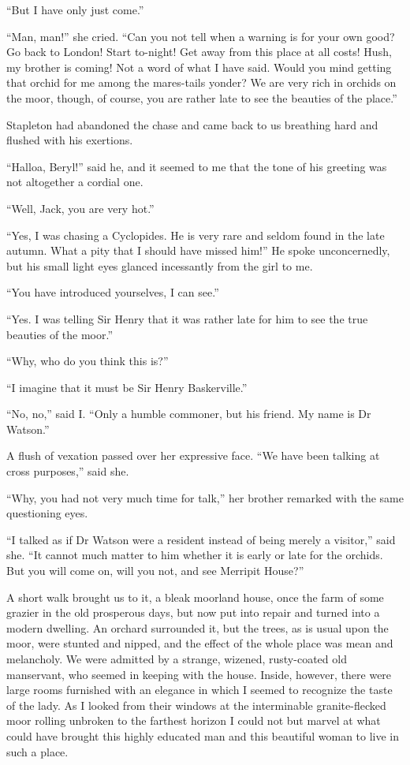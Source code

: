 \documentclass[paper=5.5in:8.5in,BCOR=7mm,twoside,DIV=calc,12pt,usegeometry,openany,chapterprefix,endperiod]{scrbook} %
\begin{document}
\enquote{But I have only just come.}

\enquote{Man, man!} she cried. \enquote{Can you not tell when a warning is for your own good? Go back to London! Start to-night! Get away from this place at all costs! Hush, my brother is coming! Not a word of what I have said. Would you mind getting that orchid for me among the mares-tails yonder? We are very rich in orchids on the moor, though, of course, you are rather late to see the beauties of the place.}

Stapleton had abandoned the chase and came back to us breathing hard and flushed with his exertions.

\enquote{Halloa, Beryl!} said he, and it seemed to me that the tone of his greeting was not altogether a cordial one.

\enquote{Well, Jack, you are very hot.}

\enquote{Yes, I was chasing a Cyclopides. He is very rare and seldom found in the late autumn. What a pity that I should have missed him!} He spoke unconcernedly, but his small light eyes glanced incessantly from the girl to me.

\enquote{You have introduced yourselves, I can see.}

\enquote{Yes. I was telling Sir Henry that it was rather late for him to see the true beauties of the moor.}

\enquote{Why, who do you think this is?}

\enquote{I imagine that it must be Sir Henry Baskerville.}

\enquote{No, no,} said I. \enquote{Only a humble commoner, but his friend. My name is Dr Watson.}

A flush of vexation passed over her expressive face. \enquote{We have been talking at cross purposes,} said she.

\enquote{Why, you had not very much time for talk,} her brother remarked with the same questioning eyes.

\enquote{I talked as if Dr Watson were a resident instead of being merely a visitor,} said she. \enquote{It cannot much matter to him whether it is early or late for the orchids. But you will come on, will you not, and see Merripit House?}

A short walk brought us to it, a bleak moorland house, once the farm of some grazier in the old prosperous days, but now put into repair and turned into a modern dwelling. An orchard surrounded it, but the trees, as is usual upon the moor, were stunted and nipped, and the effect of the whole place was mean and melancholy. We were admitted by a strange, wizened, rusty-coated old manservant, who seemed in keeping with the house. Inside, however, there were large rooms furnished with an elegance in which I seemed to recognize the taste of the lady. As I looked from their windows at the interminable granite-flecked moor rolling unbroken to the farthest horizon I could not but marvel at what could have brought this highly educated man and this beautiful woman to live in such a place.
\end{document}
